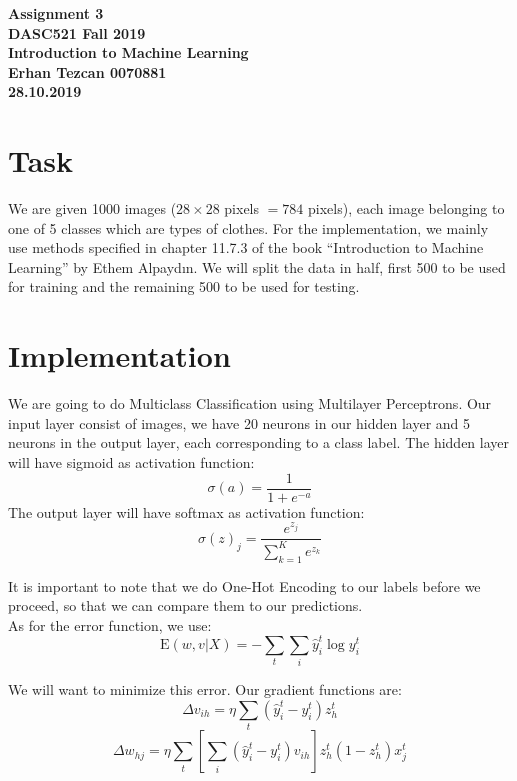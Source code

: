 \documentclass[12pt,reqno]{amsart}
\begin{document}
\begin{center}
\large\textbf{Assignment 3 \\ DASC521 Fall 2019} \\
\normalsize\textbf{Introduction to Machine Learning \\  Erhan Tezcan 0070881 \\ 28.10.2019} \\
\end{center}

\section{Task}
We are given 1000 images ($28\times28$ pixels $= 784$ pixels), each image belonging to one of 5 classes which are types of clothes. For the implementation, we mainly use methods specified in chapter 11.7.3 of the book ``Introduction to Machine Learning'' by Ethem Alpaydın. We will split the data in half, first 500 to be used for training and the remaining 500 to be used for testing.

\section{Implementation}
We are going to do Multiclass Classification using Multilayer Perceptrons. Our input layer consist of images, we have 20 neurons in our hidden layer and 5 neurons in the output layer, each corresponding to a class label. The hidden layer will have sigmoid as activation function:
\begin{equation}
\sigma(a) = \frac{1}{1 + e^{-a}}
\end{equation} 
The output layer will have softmax as activation function:
\begin{equation}
\sigma(z)_j = \frac{e^{z_j}}{\sum_{k=1}^{K}e^{z_k}}
\end{equation}

It is important to note that we do One-Hot Encoding to our labels before we proceed, so that we can compare them to our predictions. \\

As for the error function, we use:
\begin{equation}
\text{E}(w, v|X) = - \sum_t \sum_i \hat{y}_i^t \log y_i^t
\end{equation}

We will want to minimize this error. Our gradient functions are:
\begin{equation}
\Delta v_{ih} = \eta \sum_t (\hat{y}_i^t - y_i^t)z_h^t
\end{equation}
\begin{equation}
\Delta w_{hj} = \eta \sum_t \left[ \sum_i (\hat{y}_i^t - y_i^t)v_{ih} \right]z_h^t (1 - z_h^t) x_j^t
\end{equation}
\end{document}

